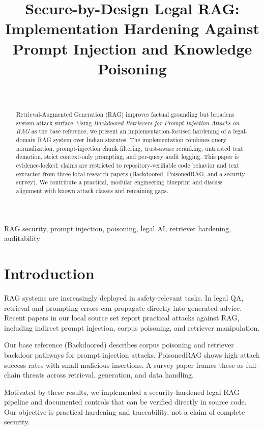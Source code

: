 \documentclass[conference]{IEEEtran}
\title{Secure-by-Design Legal RAG:\\
Implementation Hardening Against Prompt Injection and Knowledge Poisoning}
\author{\IEEEauthorblockN{Anonymous Author(s)}\\
\IEEEauthorblockA{Evidence-locked draft generated from repository implementation and local paper sources}}
\begin{document}
\maketitle

\begin{abstract}
Retrieval-Augmented Generation (RAG) improves factual grounding but broadens system attack surface. Using \emph{Backdoored Retrievers for Prompt Injection Attacks on RAG} as the base reference, we present an implementation-focused hardening of a legal-domain RAG system over Indian statutes. The implementation combines query normalization, prompt-injection chunk filtering, trust-aware reranking, untrusted text demotion, strict context-only prompting, and per-query audit logging. This paper is evidence-locked: claims are restricted to repository-verifiable code behavior and text extracted from three local research papers (Backdoored, PoisonedRAG, and a security survey). We contribute a practical, modular engineering blueprint and discuss alignment with known attack classes and remaining gaps.
\end{abstract}

\begin{IEEEkeywords}
RAG security, prompt injection, poisoning, legal AI, retriever hardening, auditability
\end{IEEEkeywords}

\section{Introduction}
RAG systems are increasingly deployed in safety-relevant tasks. In legal QA, retrieval and prompting errors can propagate directly into generated advice. Recent papers in our local source set report practical attacks against RAG, including indirect prompt injection, corpus poisoning, and retriever manipulation.

Our base reference (Backdoored) describes corpus poisoning and retriever backdoor pathways for prompt injection attacks. PoisonedRAG shows high attack success rates with small malicious insertions. A survey paper frames these as full-chain threats across retrieval, generation, and data handling.

Motivated by these results, we implemented a security-hardened legal RAG pipeline and documented controls that can be verified directly in source code. Our objective is practical hardening and traceability, not a claim of complete security.
\end{document}
